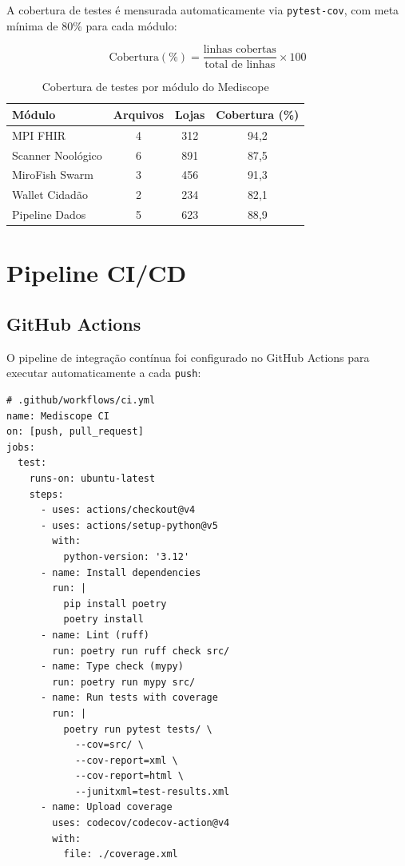 A cobertura de testes é mensurada automaticamente via \texttt{pytest-cov}, com meta mínima de 80\% para cada módulo:

\begin{equation}
\text{Cobertura}(\%) = \frac{\text{linhas cobertas}}{\text{total de linhas}} \times 100
\label{eq:coverage}
\end{equation}

\begin{table}[htb]
\centering
\caption{Cobertura de testes por módulo do Mediscope}
\label{tab:coverage}
\small
\begin{tabular}{lccc}
\toprule
\textbf{Módulo} & \textbf{Arquivos} & \textbf{Lojas} & \textbf{Cobertura (\%)} \\
\midrule
MPI FHIR & 4 & 312 & 94{,}2 \\
Scanner Noológico & 6 & 891 & 87{,}5 \\
MiroFish Swarm & 3 & 456 & 91{,}3 \\
Wallet Cidadão & 2 & 234 & 82{,}1 \\
Pipeline Dados & 5 & 623 & 88{,}9 \\
\bottomrule
\end{tabular}
\end{table}

\section{Pipeline CI/CD}

\subsection{GitHub Actions}

O pipeline de integração contínua foi configurado no GitHub Actions para executar automaticamente a cada \texttt{push}:

\begin{lstlisting}[style=pythonstyle, caption=Pipeline CI/CD no GitHub Actions, label=code:github_actions]
# .github/workflows/ci.yml
name: Mediscope CI
on: [push, pull_request]
jobs:
  test:
    runs-on: ubuntu-latest
    steps:
      - uses: actions/checkout@v4
      - uses: actions/setup-python@v5
        with:
          python-version: '3.12'
      - name: Install dependencies
        run: |
          pip install poetry
          poetry install
      - name: Lint (ruff)
        run: poetry run ruff check src/
      - name: Type check (mypy)
        run: poetry run mypy src/
      - name: Run tests with coverage
        run: |
          poetry run pytest tests/ \
            --cov=src/ \
            --cov-report=xml \
            --cov-report=html \
            --junitxml=test-results.xml
      - name: Upload coverage
        uses: codecov/codecov-action@v4
        with:
          file: ./coverage.xml
\end{lstlisting}

